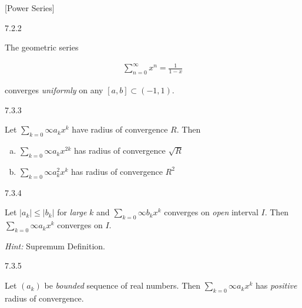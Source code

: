 \documentclass[10pt]{article} %
\newcommand{\Hint}{\vspace{0.2em}\textit{Hint: }}
\renewcommand{\leq}{\leqslant}
\begin{document}
\begin{multicols}{3}
\begin{remark}{[Power Series]}{}
\end{remark}

\begin{exercise}{7.2.2}{}

    The geometric series

        \begin{align*}
            \sum_{n=0}^{\infty} x^n = \frac{1}{1 - x}
        \end{align*}

    converges \emph{uniformly} on any $[a,b] \subset (-1,1)$.

\end{exercise}

\begin{exercise}{7.3.3}{}

    Let $\sum_{k=0}{\infty} a_k x^k$ have radius of convergence $R$. Then

        \begin{enumerate}[a)]
            \item $\sum_{k=0}{\infty} a_k x^{2k}$ has radius of convergence $\sqrt{R}$
            \item $\sum_{k=0}{\infty} a_k^2 x^k$ has radius of convergence $R^2$
        \end{enumerate}

\end{exercise}

\begin{exercise}{7.3.4}{}

    Let $|a_k| \leq |b_k|$ for \emph{large} $k$ and $\sum_{k=0}{\infty} b_k x^k$ converges on \emph{open} interval $I$. Then $\sum_{k=0}{\infty} a_k x^k$ converges on $I$.

    \Hint Supremum Definition.

\end{exercise}

\begin{exercise}{7.3.5}{}

    Let $(a_k)$ be \emph{bounded} sequence of real numbers. Then $\sum_{k=0}{\infty} a_k x^k$ has \emph{positive} radius of convergence.

\end{exercise}



\end{multicols}
\end{document}
